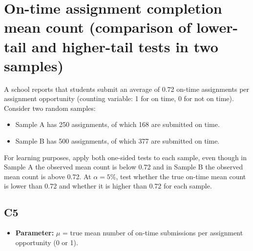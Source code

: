 \begin{center}
\end{center}



\begin{center}
\end{center}


\begin{center}
\end{center}


\section{On-time assignment completion mean count (comparison of lower-tail and higher-tail tests in two samples)}
A school reports that students submit an average of 0.72 on-time assignments per assignment opportunity (counting variable: 1 for on time, 0 for not on time). Consider two random samples:
\begin{itemize}
	\item Sample A has 250 assignments, of which 168 are submitted on time.
	\item Sample B has 500 assignments, of which 377 are submitted on time.
\end{itemize}
For learning purposes, apply both one-sided tests to each sample, even though in Sample A the observed mean count is below 0.72 and in Sample B the observed mean count is above 0.72. At \(\alpha=5\%\), test whether the true on-time mean count is lower than 0.72 and whether it is higher than 0.72 for each sample.

\subsection*{C5}
\begin{itemize}
	\item \textbf{Parameter:} \(\mu\) = true mean number of on-time submissions per assignment opportunity (0 or 1).
\end{itemize}

